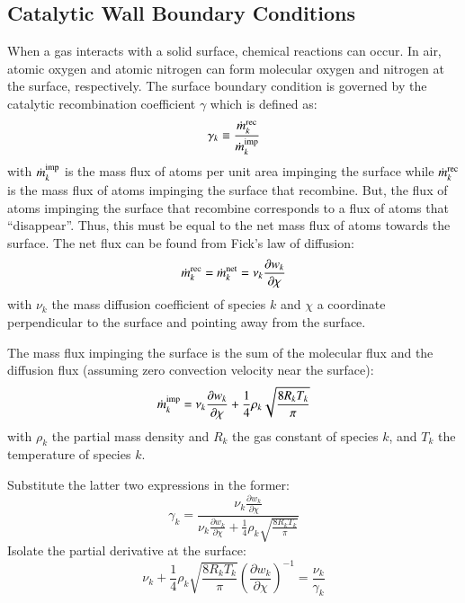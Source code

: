 \documentclass{warpdoc}
\begin{document}
\subsection{Catalytic Wall Boundary Conditions}

When a gas interacts with a solid surface, chemical reactions can occur. In air, atomic oxygen and atomic nitrogen can form molecular oxygen and nitrogen at the surface, respectively. The surface boundary condition is governed by the catalytic recombination coefficient $\gamma$ which is defined as:
%
\begin{equation}
\gamma_k \equiv \frac{\dot{m}^{\rm rec}_k}{\dot{m}^{\rm imp}_k}
\end{equation}
%
with $\dot{m}^{\rm imp}_k$ is the mass flux of atoms per unit area impinging the surface while $\dot{m}^{\rm rec}_k$ is the mass flux of atoms impinging the surface that recombine. But, the flux of atoms impinging the surface that recombine corresponds to a flux of atoms that ``disappear''. Thus, this must be equal to the net mass flux of atoms towards the surface. The net flux can be found from Fick's law of diffusion:
%
\begin{equation}
\dot{m}^{\rm rec}_k=\dot{m}^{\rm net}_k = \nu_k \frac{\partial w_k}{\partial \chi}
\end{equation}
%
with $\nu_k$ the mass diffusion coefficient of species $k$ and $\chi$ a coordinate perpendicular to the surface and pointing away from the surface.

The mass flux impinging the surface is the sum of the molecular flux and the diffusion flux (assuming zero convection velocity near the surface):
%
\begin{equation}
  \dot{m}^{\rm imp}_k = \nu_k \frac{\partial w_k}{\partial \chi} + \frac{1}{4} \rho_k \sqrt{\frac{8 R_k T_k}{\pi}}
\end{equation}
%
with $\rho_k$ the partial mass density and $R_k$ the gas constant of species $k$, and $T_k$ the temperature of species $k$.

Substitute the latter two expressions in the former:
%
\begin{equation}
\gamma_k = \frac{\nu_k \frac{\partial w_k}{\partial \chi}}{\nu_k \frac{\partial w_k}{\partial \chi} + \frac{1}{4} \rho_k \sqrt{\frac{8 R_k T_k}{\pi}}}
\end{equation}
%
Isolate the partial derivative at the surface:
%
\begin{equation}
\nu_k  + \frac{1}{4} \rho_k \sqrt{\frac{8 R_k T_k}{\pi}} \left( \frac{\partial w_k}{\partial \chi} \right)^{-1} = \frac{\nu_k }{\gamma_k}
\end{equation}
%
\end{document}
